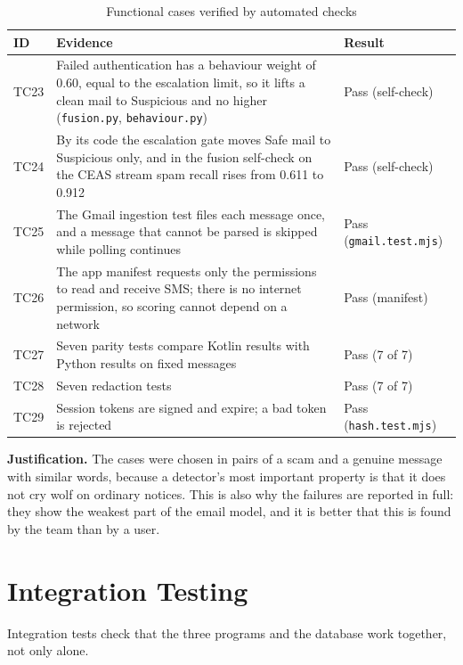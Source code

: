 {\begin{table}[H]
\caption{Functional cases verified by automated checks}
\label{tab:ftres2}
\centering\small{}
\begin{tabular}{|p{1.1cm}|p{8.6cm}|p{4.5cm}|}
\hline
\textbf{ID} & \textbf{Evidence} & \textbf{Result} \\ \hline
TC23 & Failed authentication has a behaviour weight of 0.60, equal to the escalation limit, so it lifts a clean mail to Suspicious and no higher (\texttt{fusion.py}, \texttt{behaviour.py}) & Pass (self-check) \\ \hline
TC24 & By its code the escalation gate moves Safe mail to Suspicious only, and in the fusion self-check on the CEAS stream spam recall rises from 0.611 to 0.912 & Pass (self-check) \\ \hline
TC25 & The Gmail ingestion test files each message once, and a message that cannot be parsed is skipped while polling continues & Pass (\texttt{gmail.test.mjs}) \\ \hline
TC26 & The app manifest requests only the permissions to read and receive SMS; there is no internet permission, so scoring cannot depend on a network & Pass (manifest) \\ \hline
TC27 & Seven parity tests compare Kotlin results with Python results on fixed messages & Pass (7 of 7) \\ \hline
TC28 & Seven redaction tests & Pass (7 of 7) \\ \hline
TC29 & Session tokens are signed and expire; a bad token is rejected & Pass (\texttt{hash.test.mjs}) \\ \hline
\end{tabular}
\end{table}

\textbf{Justification.} The cases were chosen in pairs of a scam and a genuine message with similar words, because a detector's most important property is that it does not cry wolf on ordinary notices. This is also why the failures are reported in full: they show the weakest part of the email model, and it is better that this is found by the team than by a user.

\section{Integration Testing}\label{sec:it}
Integration tests check that the three programs and the database work together, not only alone.

}
